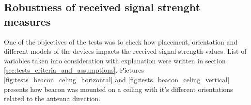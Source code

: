 \documentclass[../main.tex]{subfiles}
\begin{document}
\FloatBarrier

\subsection{Robustness of received signal strenght measures} %
\label{sub:robustness_of_received_signal_strenght_measures}


One of the objectives of the tests was to check how placement, orientation and different models of the devices impacts the received signal strength values. List of variables taken into consideration with explanation were written in section \ref{sec:tests_criteria_and_assumptions}. Pictures \ref{fig:tests_beacon_celing_horizontal} and \ref{fig:tests_beacon_celing_vertical} presents how beacon was mounted on a ceiling with it's different orientations related to the antenna direction.
\end{document}
